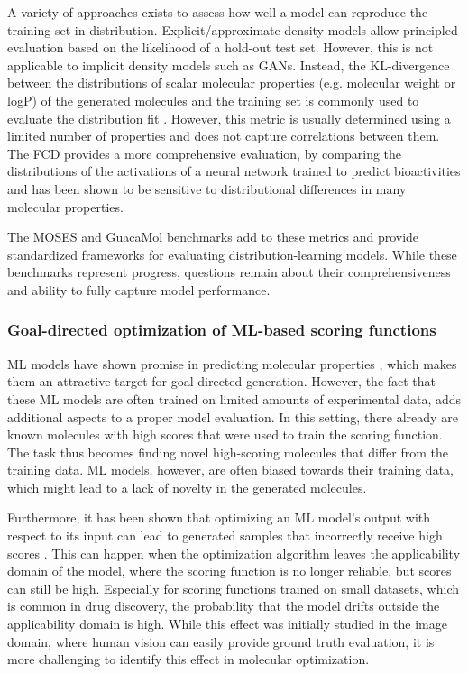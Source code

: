 A variety of approaches exists to assess how well a model can reproduce the training set in
distribution. Explicit/approximate density models allow principled evaluation based on the
likelihood of a hold-out test set. However, this is not applicable to implicit density models such
as \acp{GAN}. Instead, the KL-divergence between the distributions of scalar molecular properties
(e.g. molecular weight or logP) of the generated molecules and the training set is commonly used to
evaluate the distribution fit
\citep{brownGuacaMolBenchmarkingModels2019,polykovskiyMolecularSetsMOSES2020}. However, this metric
is usually determined using a limited number of properties and does not capture correlations between
them. The \ac{FCD} \citep{preuerFrechetChemNetDistance2018} provides a more comprehensive
evaluation, by comparing the distributions of the activations of a neural network trained to predict
bioactivities and has been shown to be sensitive to distributional differences in many molecular
properties.

The MOSES \citep{polykovskiyMolecularSetsMOSES2020} and GuacaMol
\citep{brownGuacaMolBenchmarkingModels2019} benchmarks add to these metrics and provide standardized
frameworks for evaluating distribution-learning models. While these benchmarks represent progress,
questions remain about their comprehensiveness and ability to fully capture model performance.

\subsubsection{Goal-directed optimization of ML-based scoring functions}
\ac{ML} models have shown promise in predicting molecular properties
\citep{mayrDeepToxToxicityPrediction2016,klambauerMachineLearningDrug2019,vamathevanApplicationsMachineLearning2019,chenRiseDeepLearning2018,stokesDeepLearningApproach2020},
which makes them an attractive target for goal-directed generation. However, the fact that these
\ac{ML} models are often trained on limited amounts of experimental data, adds additional aspects
to a proper model evaluation. In this setting, there already are known molecules with high scores
that were used to train the scoring function. The task thus becomes finding novel
high-scoring molecules that differ from the training data. \ac{ML} models, however, are
often biased towards their training data, which might lead to a lack of novelty in the generated
molecules.

Furthermore, it has been shown that optimizing an \ac{ML} model's output with respect to its input
can lead to generated samples that incorrectly receive high scores
\citep{szegedyIntriguingPropertiesNeural2014,goodfellowExplainingHarnessingAdversarial2015}. This
can happen when the optimization algorithm leaves the applicability domain of the model, where the
scoring function is no longer reliable, but scores can still be high. Especially for scoring
functions trained on small datasets, which is common in drug discovery, the probability that the
model drifts outside the applicability domain is high. While this effect was initially studied in
the image domain, where human vision can easily provide ground truth evaluation, it is more
challenging to identify this effect in molecular optimization.

